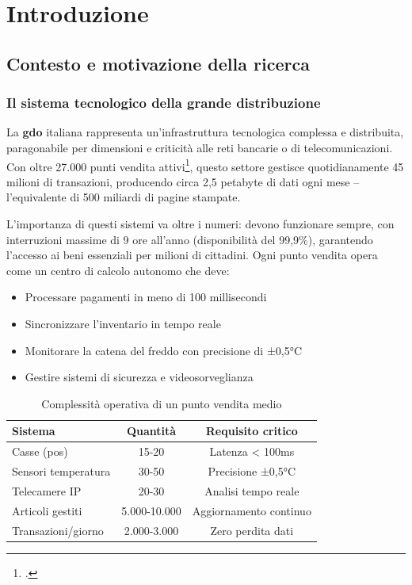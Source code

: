 \chapter{\texorpdfstring{Introduzione}{Capitolo 1 - Introduzione}}
\label{cap:introduzione}

\section{\texorpdfstring{Contesto e motivazione della ricerca}{1.1 - Contesto e motivazione della ricerca}}
\label{sec:contesto_motivazione}

\subsection{\texorpdfstring{Il sistema tecnologico della grande distribuzione}{1.1.1 - Il sistema tecnologico della grande distribuzione}}
\label{subsec:sistema_tecnologico}

La \textbf{\gls{gdo}} italiana rappresenta un'infrastruttura tecnologica complessa e distribuita, paragonabile per dimensioni e criticità alle reti bancarie o di telecomunicazioni. Con oltre 27.000 punti vendita attivi\footcite{istat2024}, questo settore gestisce quotidianamente 45 milioni di transazioni, producendo circa 2,5 petabyte di dati ogni mese – l'equivalente di 500 miliardi di pagine stampate.

L'importanza di questi sistemi va oltre i numeri: devono funzionare sempre, con interruzioni massime di 9 ore all'anno (disponibilità del 99,9\%), garantendo l'accesso ai beni essenziali per milioni di cittadini. Ogni punto vendita opera come un centro di calcolo autonomo che deve:

\begin{itemize}
\item Processare pagamenti in meno di 100 millisecondi
\item Sincronizzare l'inventario in tempo reale
\item Monitorare la catena del freddo con precisione di ±0,5°C
\item Gestire sistemi di sicurezza e videosorveglianza
\end{itemize}

\begin{table}[htbp]
\centering
\caption{Complessità operativa di un punto vendita medio}
\label{tab:complessita_pv}
\begin{tabular}{|l|c|c|}
\hline
\textbf{Sistema} & \textbf{Quantità} & \textbf{Requisito critico} \\
\hline
Casse (\gls{pos}) & 15-20 & Latenza < 100ms \\
Sensori temperatura & 30-50 & Precisione ±0,5°C \\
Telecamere IP & 20-30 & Analisi tempo reale \\
Articoli gestiti & 5.000-10.000 & Aggiornamento continuo \\
Transazioni/giorno & 2.000-3.000 & Zero perdita dati \\
\hline
\end{tabular}
\end{table}

